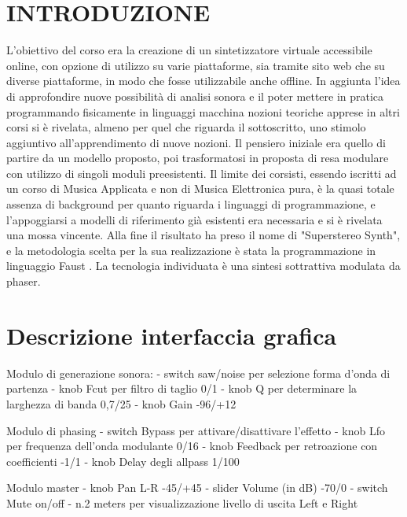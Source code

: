 \documentclass[
	a4paper,
	twocolumn
	]{article}
\begin{document}
\maketitle
\thispagestyle{empty}
\section*{INTRODUZIONE}

L’obiettivo del corso era la creazione di un sintetizzatore virtuale accessibile
online, con opzione di utilizzo su varie piattaforme, sia tramite sito web che
su diverse piattaforme, in modo che fosse utilizzabile anche offline. In
aggiunta l'idea di approfondire nuove possibilità di analisi sonora e il poter
mettere in pratica programmando fisicamente in linguaggi macchina nozioni
teoriche apprese in altri corsi si è rivelata, almeno per quel che riguarda il
sottoscritto, uno stimolo aggiuntivo all'apprendimento di nuove nozioni. Il
pensiero iniziale era quello di partire da un modello proposto, poi
trasformatosi in proposta di resa modulare con utilizzo di singoli moduli
preesistenti. Il limite dei corsisti, essendo iscritti ad un corso di Musica
Applicata e non di Musica Elettronica pura, è la quasi totale assenza di
background per quanto riguarda i linguaggi di programmazione, e l'appoggiarsi a
modelli di riferimento già esistenti era necessaria e si è rivelata una mossa
vincente.
Alla fine il risultato ha preso il nome di "Superstereo Synth", e la metodologia
scelta per la sua realizzazione è stata la programmazione in linguaggio Faust
\cite{faust}. La tecnologia individuata è una sintesi sottrattiva modulata
da phaser.

\section*{Descrizione interfaccia grafica}

Modulo di generazione sonora:
- switch saw/noise per selezione forma d’onda di partenza
- knob Fcut per filtro di taglio 0/1
- knob Q  per determinare la larghezza di banda 0,7/25
- knob Gain -96/+12

Modulo di phasing
- switch Bypass per attivare/disattivare l’effetto
- knob Lfo per frequenza dell’onda modulante 0/16
- knob Feedback per retroazione con coefficienti -1/1
- knob Delay degli allpass 1/100

Modulo master
- knob Pan L-R  -45/+45
- slider Volume (in dB) -70/0
- switch Mute on/off
- n.2 meters per visualizzazione livello di uscita Left e Right
\end{document}
